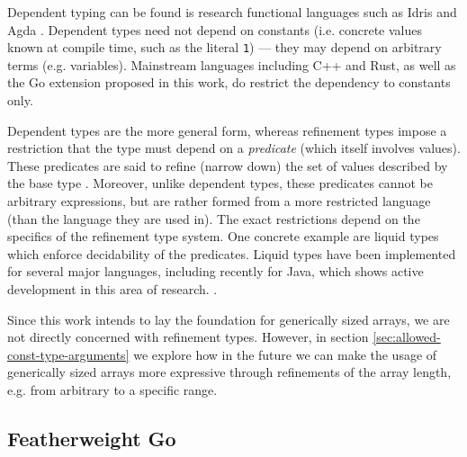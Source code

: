 Dependent typing can be found is research functional languages such as Idris and
Agda \autocites{idris}{agda}. Dependent types need not depend on constants (i.e.
concrete values known at compile time, such as the literal \texttt{1}) --- they
may depend on arbitrary terms (e.g. variables). Mainstream languages including
C++ and Rust, as well as the Go extension proposed in this work, do restrict the
dependency to constants only.




Dependent types are the more general form, whereas refinement types impose a
restriction that the type must depend on a \emph{predicate} (which itself
involves values). These predicates are said to refine (narrow down) the set of
values described by the base type \autocite{refinement}. Moreover, unlike
dependent types, these predicates cannot be arbitrary expressions, but are
rather formed from a more restricted language (than the language they are used
in). The exact restrictions depend on the specifics of the refinement type
system. One concrete example are liquid types which enforce decidability of the
predicates. Liquid types have been implemented for several major languages,
including recently for Java, which shows active development in this area of
research. \autocites{liquidTypesBlog}{liquidJava}.

Since this work intends to lay the foundation for generically sized arrays, we
are not directly concerned with refinement types. However, in section
\ref{sec:allowed-const-type-arguments} we explore how in the
future we can make the usage of generically sized arrays more expressive through
refinements of the array length, e.g. from arbitrary to a specific range.

\subsection{Featherweight Go}

